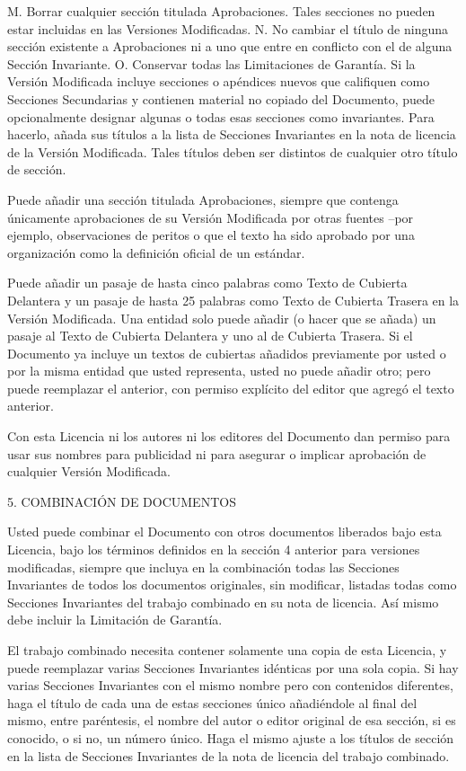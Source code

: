 \documentclass[a4paper, 11pt, oneside]{report}
\begin{document}
M. Borrar cualquier sección titulada Aprobaciones. Tales secciones no pueden estar incluidas en las Versiones Modificadas.
N. No cambiar el título de ninguna sección existente a Aprobaciones ni a uno que entre en conflicto con el de alguna Sección Invariante.
O. Conservar todas las Limitaciones de Garantía.
Si la Versión Modificada incluye secciones o apéndices nuevos que califiquen como Secciones Secundarias y contienen material no copiado del Documento, puede opcionalmente designar algunas o todas esas secciones como invariantes. Para hacerlo, añada sus títulos a la lista de Secciones Invariantes en la nota de licencia de la Versión Modificada. Tales títulos deben ser distintos de cualquier otro título de sección.

Puede añadir una sección titulada Aprobaciones, siempre que contenga únicamente aprobaciones de su Versión Modificada por otras fuentes --por ejemplo, observaciones de peritos o que el texto ha sido aprobado por una organización como la definición oficial de un estándar.

Puede añadir un pasaje de hasta cinco palabras como Texto de Cubierta Delantera y un pasaje de hasta 25 palabras como Texto de Cubierta Trasera en la Versión Modificada. Una entidad solo puede añadir (o hacer que se añada) un pasaje al Texto de Cubierta Delantera y uno al de Cubierta Trasera. Si el Documento ya incluye un textos de cubiertas añadidos previamente por usted o por la misma entidad que usted representa, usted no puede añadir otro; pero puede reemplazar el anterior, con permiso explícito del editor que agregó el texto anterior.

Con esta Licencia ni los autores ni los editores del Documento dan permiso para usar sus nombres para publicidad ni para asegurar o implicar aprobación de cualquier Versión Modificada.

5. COMBINACIÓN DE DOCUMENTOS

Usted puede combinar el Documento con otros documentos liberados bajo esta Licencia, bajo los términos definidos en la sección 4 anterior para versiones modificadas, siempre que incluya en la combinación todas las Secciones Invariantes de todos los documentos originales, sin modificar, listadas todas como Secciones Invariantes del trabajo combinado en su nota de licencia. Así mismo debe incluir la Limitación de Garantía.

El trabajo combinado necesita contener solamente una copia de esta Licencia, y puede reemplazar varias Secciones Invariantes idénticas por una sola copia. Si hay varias Secciones Invariantes con el mismo nombre pero con contenidos diferentes, haga el título de cada una de estas secciones único añadiéndole al final del mismo, entre paréntesis, el nombre del autor o editor original de esa sección, si es conocido, o si no, un número único. Haga el mismo ajuste a los títulos de sección en la lista de Secciones Invariantes de la nota de licencia del trabajo combinado.
\end{document}
